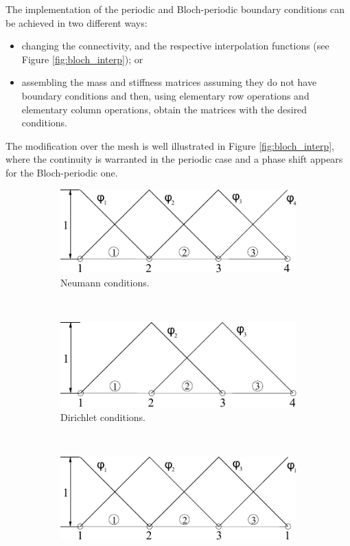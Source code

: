 The implementation of the periodic and Bloch-periodic boundary conditions can be achieved in two different ways:
\begin{itemize}
\item changing the connectivity, and the respective interpolation functions (see Figure \ref{fig:bloch_interp}); or
\item assembling the mass and stiffness matrices assuming they do not have boundary conditions and then, using elementary row operations and elementary column operations, obtain the matrices with the desired conditions.
\end{itemize}
The modification over the mesh is well illustrated in Figure \ref{fig:bloch_interp}, where the continuity is warranted in the periodic case and a phase shift appears for the Bloch-periodic one.
\begin{figure}[H]
\centering
	\begin{subfigure}[b]{0.4\textwidth}\qquad
		\includegraphics[width=\textwidth]{periodic-interpolation-a.pdf}
		\caption{Neumann conditions. }
	\end{subfigure}\,
%
	\begin{subfigure}[b]{0.4\textwidth}\qquad
		\includegraphics[width=\textwidth]{periodic-interpolation-b.pdf}
		\caption{Dirichlet conditions.}
	\end{subfigure}\\
%
	\begin{subfigure}[b]{0.4\textwidth}\qquad
		\includegraphics[width=\textwidth]{periodic-interpolation-c.pdf}

\end{subfigure}
\end{figure}
